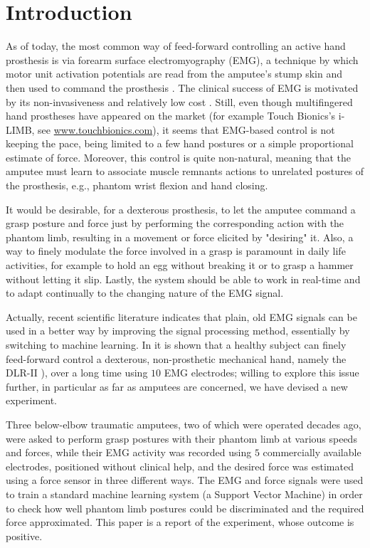 \section{Introduction}
\label{sec:intro}

As of today, the most common way of feed-forward controlling an active
hand prosthesis is via forearm surface electromyography (EMG),
a technique by which motor unit activation potentials are read from the
amputee's stump skin and then used to command the prosthesis \cite{deluca97}.
The clinical success of EMG is motivated by its non-invasiveness and
relatively low cost \cite{englehart06}.
Still, even though multifingered hand prostheses have appeared on the market
(for example Touch Bionics's i-LIMB, see \url{www.touchbionics.com}),
it seems that EMG-based control is not keeping the pace, being limited to a
few hand postures or a simple proportional estimate of force.
Moreover, this control is quite non-natural, meaning that the amputee must
learn to associate muscle remnants actions to unrelated postures of the
prosthesis, e.g., phantom wrist flexion and hand closing.

It would be desirable, for a dexterous prosthesis, to let the amputee command a
grasp posture and force just by performing the corresponding action with the
phantom limb, resulting in a movement or force elicited by "desiring"
it. Also, a way to finely modulate the force involved in a grasp is paramount
in daily life activities, for example to hold an egg without breaking it or to
grasp a hammer without letting it slip. Lastly, the system should be able to
work in real-time and to adapt continually to the changing nature of the EMG
signal.

Actually, recent scientific literature
indicates that plain, old EMG signals can be used in a better way by improving
the signal processing method, essentially by switching to machine learning.
In \cite{2008.BioCyb} it is shown that a healthy subject can finely feed-forward
control a dexterous, non-prosthetic mechanical hand, namely the DLR-II
\cite{ButFisGre2004}), over a long time using $10$ EMG electrodes; willing to
explore this issue further, in particular as far as amputees are concerned, we
have devised a new experiment.

Three below-elbow traumatic amputees, two of which
were operated decades ago, were asked to perform
grasp postures with their phantom limb at various speeds and forces, while their
EMG activity was recorded using $5$ commercially available electrodes, positioned
without clinical help, and the desired force was
estimated using a force sensor in three different ways.
The EMG and force signals were used to train a standard machine learning system
(a Support Vector Machine) in order to check how well phantom limb postures
could be discriminated and the required force approximated. This paper is
a report of the experiment, whose outcome is positive.

